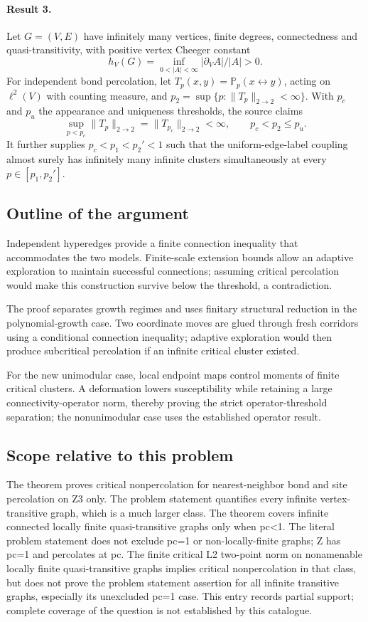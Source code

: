 \documentclass[11pt]{article}
\begin{document}
\paragraph{Result 3.} Let \(G=(V,E)\) have infinitely many vertices, finite degrees, connectedness and quasi-transitivity, with positive vertex Cheeger constant
\[
 h_V(G)=\inf_{0<|A|<\infty}|\partial_VA|/|A|>0.
\]
For independent bond percolation, let \(T_p(x,y)=\mathbb P_p(x\leftrightarrow y)\), acting on \(\ell^2(V)\) with counting measure, and \(p_2=\sup\{p:\|T_p\|_{2\to2}<\infty\}\). With \(p_c\) and \(p_u\) the appearance and uniqueness thresholds, the source claims
\[
 \sup_{p<p_c}\|T_p\|_{2\to2}=\|T_{p_c}\|_{2\to2}<\infty,
 \qquad p_c<p_2\le p_u.
\]
It further supplies \(p_c<p_1<p_2'<1\) such that the uniform-edge-label coupling almost surely has infinitely many infinite clusters simultaneously at every \(p\in[p_1,p_2']\).

\subsection{Outline of the argument}
Independent hyperedges provide a finite connection inequality that accommodates the two models. Finite-scale extension bounds allow an adaptive exploration to maintain successful connections; assuming critical percolation would make this construction survive below the threshold, a contradiction.

The proof separates growth regimes and uses finitary structural reduction in the polynomial-growth case. Two coordinate moves are glued through fresh corridors using a conditional connection inequality; adaptive exploration would then produce subcritical percolation if an infinite critical cluster existed.

For the new unimodular case, local endpoint maps control moments of finite critical clusters. A deformation lowers susceptibility while retaining a large connectivity-operator norm, thereby proving the strict operator-threshold separation; the nonunimodular case uses the established operator result.

\subsection{Scope relative to this problem}
The theorem proves critical nonpercolation for nearest-neighbor bond and site percolation on Z3 only. The problem statement quantifies every infinite vertex-transitive graph, which is a much larger class. The theorem covers infinite connected locally finite quasi-transitive graphs only when pc<1. The literal problem statement does not exclude pc=1 or non-locally-finite graphs; Z has pc=1 and percolates at pc. The finite critical L2 two-point norm on nonamenable locally finite quasi-transitive graphs implies critical nonpercolation in that class, but does not prove the problem statement assertion for all infinite transitive graphs, especially its unexcluded pc=1 case. This entry records partial support; complete coverage of the question is not established by this catalogue.
\end{document}
